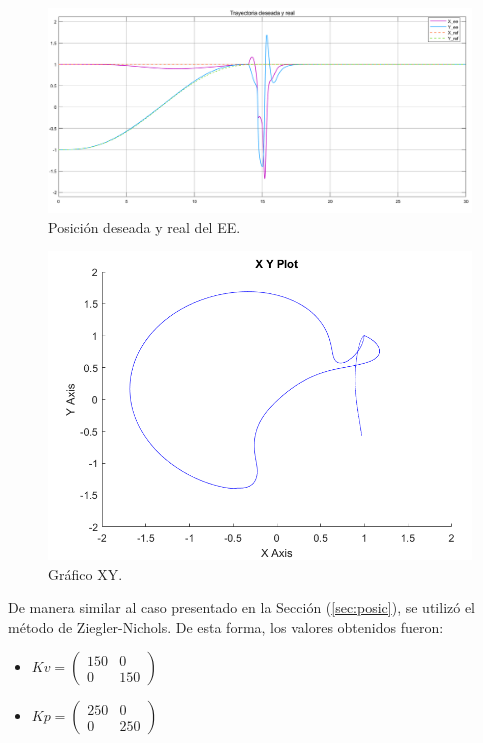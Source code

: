 \begin{figure}[H]
	\centering
	\includegraphics[width=0.8\linewidth]{ImagenesControl de posición no lineal/1_3_e_b}
	\caption{Posición deseada y real del EE.}	
	\label{fig:aposd}
\end{figure}

\begin{figure}[H]
	\centering
	\includegraphics[width=0.5\linewidth]{ImagenesControl de posición no lineal/1_3_e_c}
	\caption{Gráfico XY.}	
	\label{fig:axyd}
\end{figure}

\label{sec:fuerza}
De manera similar al caso presentado en la Sección (\ref{sec:posic}), se utilizó el método de Ziegler-Nichols. De esta forma, los valores obtenidos fueron:
\begin{multicols}{2}
\begin{itemize}
	\item $Kv = \begin{pmatrix}
	150 & 0 \\
	0 & 150
	\end{pmatrix}$
	\item $Kp = \begin{pmatrix}
	250 & 0 \\
	0 & 250
	\end{pmatrix}$
\end{itemize}
\end{multicols}


%